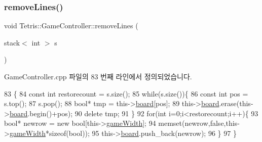 \subsubsection{\texorpdfstring{remove\+Lines()}{removeLines()}\hspace{0.1cm}{\footnotesize\ttfamily [1/2]}}
{\footnotesize\ttfamily void Tetris\+::\+Game\+Controller\+::remove\+Lines (\begin{DoxyParamCaption}\item[{stack$<$ int $>$}]{s }\end{DoxyParamCaption})}



Game\+Controller.\+cpp 파일의 83 번째 라인에서 정의되었습니다.


\begin{DoxyCode}
83                                                 \{
84                 \textcolor{keyword}{const} \textcolor{keywordtype}{int} restorecount = s.size();
85                 \textcolor{keywordflow}{while}(s.size())\{
86                     \textcolor{keyword}{const} \textcolor{keywordtype}{int} pos = s.top();
87                     s.pop();
88                     \textcolor{keywordtype}{bool}* tmp = this->\hyperlink{class_tetris_1_1_game_controller_a7725b6cec9459a6bffaa3e29dd1c5196}{board}[pos];
89                     this->\hyperlink{class_tetris_1_1_game_controller_a7725b6cec9459a6bffaa3e29dd1c5196}{board}.erase(this->\hyperlink{class_tetris_1_1_game_controller_a7725b6cec9459a6bffaa3e29dd1c5196}{board}.begin()+pos);
90                     \textcolor{keyword}{delete} tmp;
91                 \}
92                 \textcolor{keywordflow}{for}(\textcolor{keywordtype}{int} i=0;i<restorecount;i++)\{
93                     \textcolor{keywordtype}{bool}* newrow = \textcolor{keyword}{new} \textcolor{keywordtype}{bool}[this->\hyperlink{class_tetris_1_1_game_controller_a439f215918db4127fcb44cf9d501ed63}{gameWidth}];
94                     memset(newrow,\textcolor{keyword}{false},this->\hyperlink{class_tetris_1_1_game_controller_a439f215918db4127fcb44cf9d501ed63}{gameWidth}*\textcolor{keyword}{sizeof}(\textcolor{keywordtype}{bool}));
95                     this->\hyperlink{class_tetris_1_1_game_controller_a7725b6cec9459a6bffaa3e29dd1c5196}{board}.push\_back(newrow);
96                 \}
97             \}
\end{DoxyCode}
\mbox{\label{class_tetris_1_1_game_controller_aa95d44d0084ac5537f1c753796df4565}} 

